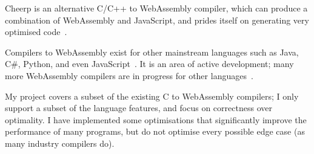 \documentclass[00-main.tex]{subfiles}
\begin{document}
Cheerp is an alternative C/C++ to WebAssembly compiler, which can produce a combination of WebAssembly and JavaScript, and prides itself on generating very optimised code~.

Compilers to WebAssembly exist for other mainstream languages such as Java, C\#, Python, and even JavaScript~.
It is an area of active development; many more WebAssembly compilers are in progress for other languages~.

My project covers a subset of the existing C to WebAssembly compilers; I only support a subset of the language features, and focus on correctness over optimality.
I have implemented some optimisations that significantly improve the performance of many programs, but do not optimise every possible edge case (as many industry compilers do).
\end{document}
